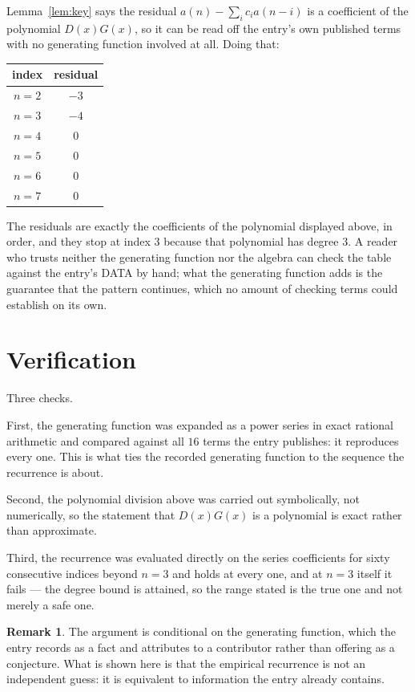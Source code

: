 \documentclass[11pt,a4paper]{article}
\theoremstyle{plain}
\theoremstyle{definition}
\newtheorem{remark}[theorem]{Remark}
\begin{document}
Lemma~\ref{lem:key} says the residual $a(n)-\sum_ic_ia(n-i)$ is a coefficient of the
polynomial $D(x)G(x)$, so it can be read off the entry's own published terms with no
generating function involved at all. Doing that:
\begin{center}
\begin{tabular}{cc}
index & residual \\ \hline
$n=2$ & $-3$ \\
$n=3$ & $-4$ \\
$n=4$ & $0$ \\
$n=5$ & $0$ \\
$n=6$ & $0$ \\
$n=7$ & $0$
\end{tabular}
\end{center}
The residuals are exactly the coefficients of the polynomial displayed above, in order, and
they stop at index $3$ because that polynomial has degree $3$. A reader who trusts
neither the generating function nor the algebra can check the table against the entry's DATA
by hand; what the generating function adds is the guarantee that the pattern continues, which
no amount of checking terms could establish on its own.

\section{Verification}

Three checks.

First, the generating function was expanded as a power series in exact rational arithmetic and
compared against all $16$ terms the entry publishes: it reproduces every one. This is
what ties the recorded generating function to the sequence the recurrence is about.

Second, the polynomial division above was carried out symbolically, not numerically, so the
statement that $D(x)G(x)$ is a polynomial is exact rather than approximate.

Third, the recurrence was evaluated directly on the series coefficients for sixty consecutive
indices beyond $n=3$ and holds at every one, and at $n=3$ itself it fails --- the
degree bound is attained, so the range stated is the true one and not merely a safe one.

\begin{remark}
The argument is conditional on the generating function, which the entry records as a fact and
attributes to a contributor rather than offering as a conjecture. What is shown here is that
the empirical recurrence is not an independent guess: it is equivalent to information the
entry already contains.
\end{remark}
\end{document}
